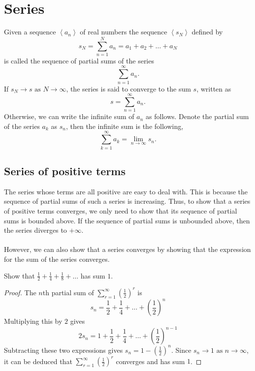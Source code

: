 \documentclass[10pt, a4paper]{article}
\newcommand{\limas}[3][n]{#2 \rightarrow #3 \text{ as } #1 \rightarrow \infty}
\newcommand{\sumfrto}[3][n = 1]{\sum_{#1}^{#2}{#3}} %
\newcommand{\sumto}[2][\infty]{\sumfrto{#1}{#2}}
\newcommand{\seq}[1][x_n]{\left\langle #1 \right\rangle}
\begin{document}
\newpage

\section{Series}
Given a sequence $\seq[a_n]$ of real numbers the sequence $\seq[s_N]$ defined by
\[
s_N = \sumto[N]{a_n} = a_1 + a_2 + \dots + a_N
\]
is called the sequence of partial sums of the series
\[
\sumto{a_n}.
\]
If $\limas[N]{s_N}{s}$, the series is said to converge to the sum $s$, written as
\[
s = \sumto{a_n}.
\]
Otherwise, we can write the infinite sum of $a_n$ as follows. Denote the partial sum of the series $a_k$ as $s_n$, then the infinite sum is the following,
\[
\sumfrto[k = 1]{\infty}{a_k} = \lim_{n \rightarrow \infty}{s_n}.
\]

\subsection{Series of positive terms}
The series whose terms are all positive are easy to deal with. This is because the sequence of partial sums of such a series is increasing. Thus, to show that a series of positive terms converges, we only need to show that its sequence of partial sums is bounded above. If the sequence of partial sums is unbounded above, then the series diverges to $+\infty$. \\
\\
However, we can also show that a series converges by showing that the expression for the sum of the series converges.
\begin{example}\label{examp_series_powtwoconv}
    Show that $\frac{1}{2} + \frac{1}{4} + \frac{1}{8} + \dotsc$ has sum $1$.
    \begin{proof}
        The $n$th partial sum of $\sum_{r = 1}^{\infty}{\left(\frac{1}{2}\right) ^ r}$ is
        \[
        s_n = \frac{1}{2} + \frac{1}{4} + \dotsc + \left(\frac{1}{2}\right) ^ n
        \]
        Multiplying this by $2$ gives
        \[
        2s_n = 1 + \frac{1}{2} + \frac{1}{4} + \dotsc + \left(\frac{1}{2}\right) ^ {n - 1}
        \]
        Subtracting these two expressions gives $s_n = 1 - \left(\frac{1}{2}\right) ^ n$. Since $\limas{s_n}{1}$, it can be deduced that $\sum_{r = 1}^{\infty}{\left(\frac{1}{2}\right) ^ r}$ converges and has sum $1$.
    \end{proof}
\end{example}
\end{document}
